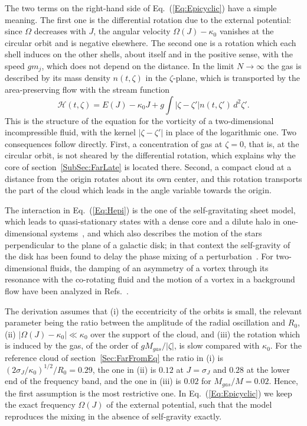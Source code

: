 The two terms on the right-hand side of Eq.~(\ref{Eq:Epicyclic}) have a simple meaning. The first one is the differential rotation due to the external potential: since $\Omega$ decreases with $J$, the angular velocity $\Omega(J) - \kappa_0$ vanishes at the circular orbit and is negative elsewhere. The second one is a rotation which each shell induces on the other shells, about itself and in the positive sense, with the speed $g m_j$, which does not depend on the distance. In the limit $N\to\infty$ the gas is described by its mass density $n(t,\zeta)$ in the $\zeta$-plane, which is transported by the area-preserving flow with the stream function
\begin{equation}
\mathcal{H}(t,\zeta) = E(J) - \kappa_0 J + g\int \left| \zeta - \zeta' \right| n(t,\zeta')\, d^2\zeta'.
\label{Eq:StreamFunction}
\end{equation}
This is the structure of the equation for the vorticity of a two-dimensional incompressible fluid, with the kernel $|\zeta - \zeta'|$ in place of the logarithmic one. Two consequences follow directly. First, a concentration of gas at $\zeta = 0$, that is, at the circular orbit, is not sheared by the differential rotation, which explains why the core of section~\ref{SubSec:FarLate} is located there. Second, a compact cloud at a distance from the origin rotates about its own center, and this rotation transports the part of the cloud which leads in the angle variable towards the origin.

The interaction in Eq.~(\ref{Eq:Hepi}) is the one of the self-gravitating sheet model, which leads to quasi-stationary states with a dense core and a dilute halo in one-dimensional systems~\cite{mJtW11,yLrPfRtTfB14}, and which also describes the motion of the stars perpendicular to the plane of a galactic disk; in that context the self-gravity of the disk has been found to delay the phase mixing of a perturbation~\cite{kDlW19,lW23,tAtA26}. For two-dimensional fluids, the damping of an asymmetry of a vortex through its resonance with the co-rotating fluid and the motion of a vortex in a background flow have been analyzed in Refs.~\cite{dSdDaCcDiLtO00,dSdD01}.

The derivation assumes that (i) the eccentricity of the orbits is small, the relevant parameter being the ratio between the amplitude of the radial oscillation and $R_0$, (ii) $|\Omega(J) - \kappa_0|\ll\kappa_0$ over the support of the cloud, and (iii) the rotation which is induced by the gas, of the order of $g M_{gas}/|\zeta|$, is slow compared with $\kappa_0$. For the reference cloud of section~\ref{Sec:FarFromEq} the ratio in (i) is $(2\sigma_J/\kappa_0)^{1/2}/R_0 = 0.29$, the one in (ii) is $0.12$ at $J = \sigma_J$ and $0.28$ at the lower end of the frequency band, and the one in (iii) is $0.02$ for $M_{gas}/M = 0.02$. Hence, the first assumption is the most restrictive one. In Eq.~(\ref{Eq:Epicyclic}) we keep the exact frequency $\Omega(J)$ of the external potential, such that the model reproduces the mixing in the absence of self-gravity exactly.


